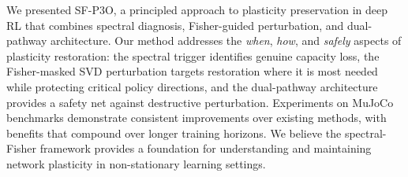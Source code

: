 \documentclass{article}
\begin{document}
We presented SF-P3O, a principled approach to plasticity preservation in deep RL that combines spectral diagnosis, Fisher-guided perturbation, and dual-pathway architecture. Our method addresses the \emph{when}, \emph{how}, and \emph{safely} aspects of plasticity restoration: the spectral trigger identifies genuine capacity loss, the Fisher-masked SVD perturbation targets restoration where it is most needed while protecting critical policy directions, and the dual-pathway architecture provides a safety net against destructive perturbation. Experiments on MuJoCo benchmarks demonstrate consistent improvements over existing methods, with benefits that compound over longer training horizons. We believe the spectral-Fisher framework provides a foundation for understanding and maintaining network plasticity in non-stationary learning settings.
\end{document}

